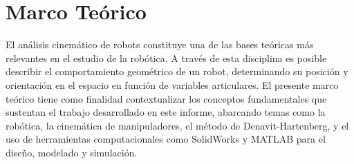 \chapter{Marco Teórico} 
\label{chap:marco_teorico}

El análisis cinemático de robots constituye una de las bases teóricas más relevantes en el estudio de la robótica. A través de esta disciplina es posible describir el comportamiento geométrico de un robot, determinando su posición y orientación en el espacio en función de variables articulares. El presente marco teórico tiene como finalidad contextualizar los conceptos fundamentales que sustentan el trabajo desarrollado en este informe, abarcando temas como la robótica, la cinemática de manipuladores, el método de Denavit-Hartenberg, y el uso de herramientas computacionales como SolidWorks y MATLAB para el diseño, modelado y simulación.